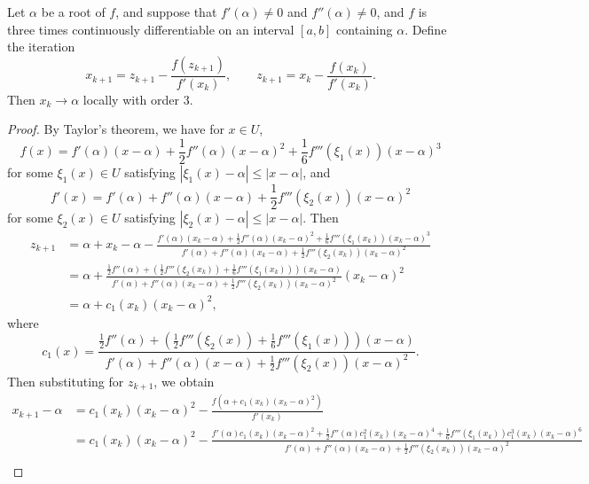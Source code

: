 \documentclass[newpage]{homework}
\begin{document}
\question Let $\alpha$ be a root of $f$, and suppose that $f'(\alpha) \ne 0$ and $f''(\alpha) \ne 0$, and $f$ is three times continuously differentiable on an interval $[a,b]$ containing $\alpha$. Define the iteration
\begin{equation*}
	x_{k+1} = z_{k+1} - \frac{f(z_{k+1})}{f'(x_{k})}, \qquad z_{k+1} = x_k - \frac{f(x_k)}{f'(x_k)}.
\end{equation*}
Then $x_k \to \alpha$ locally with order 3.
\begin{proof}
	By Taylor's theorem, we have for $x \in U$,
	\begin{equation*}
		f(x) = f'(\alpha)(x-\alpha) + \frac{1}{2}f''(\alpha)(x-\alpha)^2 + \frac{1}{6}f'''(\xi_1(x))(x-\alpha)^3
	\end{equation*}
	for some $\xi_1(x) \in U$ satisfying $|\xi_1(x) - \alpha| \le |x - \alpha|$, and
	\begin{equation*}
		f'(x) = f'(\alpha) + f''(\alpha)(x-\alpha) + \frac{1}{2}f'''(\xi_2(x))(x-\alpha)^2
	\end{equation*}
	for some $\xi_2(x) \in U$ satisfying $|\xi_2(x) - \alpha| \le |x-\alpha|$. Then
	\begin{align*}
		z_{k+1} &= \alpha + x_k - \alpha - \frac{f'(\alpha)(x_k - \alpha) + \frac{1}{2}f''(\alpha)(x_k-\alpha)^2 + \frac{1}{6}f'''(\xi_1(x_k))(x_k-\alpha)^3}{f'(\alpha) + f''(\alpha)(x_k-\alpha) + \frac{1}{2}f'''(\xi_2(x_k))(x_k-\alpha)^2} \\
		&= \alpha + \frac{\frac{1}{2}f''(\alpha) + \left(\frac{1}{2}f'''(\xi_2(x_k)) + \frac{1}{6}f'''(\xi_1(x_k))\right)(x_k-\alpha)}{f'(\alpha) + f''(\alpha)(x_k - \alpha) + \frac{1}{2}f'''(\xi_2(x_k))(x_k-\alpha)^2}(x_k-\alpha)^2 \\
		&= \alpha + c_1(x_k)(x_k-\alpha)^2,
	\end{align*}
	where
	\begin{equation*}
		c_1(x) = \frac{\frac{1}{2}f''(\alpha) + \left(\frac{1}{2}f'''(\xi_2(x)) + \frac{1}{6}f'''(\xi_1(x))\right)(x-\alpha)}{f'(\alpha) + f''(\alpha)(x - \alpha) + \frac{1}{2}f'''(\xi_2(x))(x-\alpha)^2}.
	\end{equation*}
	Then substituting for $z_{k+1}$, we obtain
	\begin{align*}
		x_{k+1} - \alpha &= c_1(x_k)(x_k-\alpha)^2 - \frac{f(\alpha + c_1(x_k)(x_k-\alpha)^2)}{f'(x_k)} \\
		&= c_1(x_k)(x_k-\alpha)^2 - \frac{f'(\alpha)c_1(x_k)(x_k-\alpha)^2 + \frac{1}{2}f''(\alpha)c_1^2(x_k)(x_k-\alpha)^4 + \frac{1}{6}f'''(\xi_1(x_k))c_1^3(x_k)(x_k-\alpha)^6}{f'(\alpha) + f''(\alpha)(x_k-\alpha) + \frac{1}{2}f'''(\xi_2(x_k))(x_k-\alpha)^2} \\

\end{align*}
\end{proof}
\end{document}
